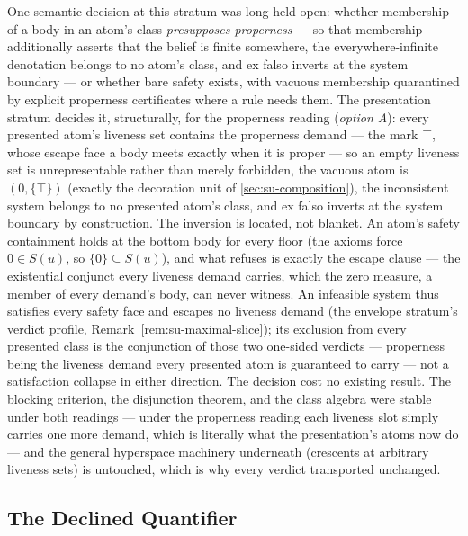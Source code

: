 \begin{remark}
\label{rem:su-presupposition-fork}
One semantic decision at this stratum was long held open: whether
membership of a body in an atom's class \emph{presupposes
properness} --- so that membership additionally asserts that the
belief is finite somewhere, the everywhere-infinite denotation
belongs to no atom's class, and ex falso inverts at the system
boundary --- or whether bare safety exists, with vacuous
membership quarantined by explicit properness certificates where a
rule needs them. The presentation stratum decides it,
structurally, for the properness reading (\emph{option A}): every
presented atom's liveness set contains the properness demand ---
the mark $\top$, whose escape face a body meets exactly when it is
proper --- so an empty liveness set is unrepresentable rather than
merely forbidden, the vacuous atom is $(0, \{\top\})$ (exactly the
decoration unit of \autoref{sec:su-composition}), the inconsistent
system belongs to no presented atom's class, and ex falso inverts
at the system boundary by construction. The inversion is located,
not blanket. An atom's safety containment holds at the bottom body
for every floor (the axioms force $0 \in S(u)$, so
$\{0\} \subseteq S(u)$), and what refuses is exactly the escape
clause --- the existential conjunct every liveness demand carries,
which the zero measure, a member of every demand's body, can never
witness. An infeasible system thus satisfies every safety face and
escapes no liveness demand (the envelope stratum's verdict
profile, Remark~\ref{rem:su-maximal-slice}); its exclusion from
every presented class is the conjunction of those two one-sided
verdicts --- properness being the liveness demand every presented
atom is guaranteed to carry --- not a satisfaction collapse in
either direction. The decision cost no existing result. The
blocking criterion, the disjunction theorem, and the class algebra
were stable under both readings --- under the properness reading
each liveness slot simply carries one more demand, which is
literally what the presentation's atoms now do --- and the general
hyperspace machinery underneath (crescents at arbitrary liveness
sets) is untouched, which is why every verdict transported
unchanged.
\end{remark}

\subsection{The Declined Quantifier}

